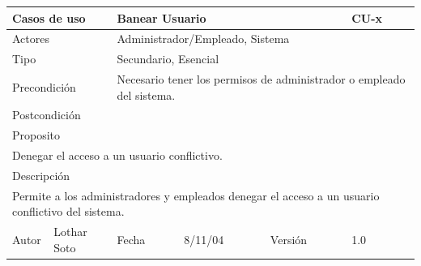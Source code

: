 \documentclass{article}
\begin{document}
\begin{table}[h]
\begin{tabular}{|l|l|l|l|l|l|}
\hline
\multicolumn{2}{|p{2cm}|}{Casos de uso}  & \multicolumn{3}{p{7cm}|}{Banear Usuario} & CU-x \\
\hline
\multicolumn{2}{|p{2cm}|}{Actores}       & \multicolumn{4}{p{8cm}|}{Administrador/Empleado, Sistema}        \\
\hline
\multicolumn{2}{|p{2cm}|}{Tipo}          & \multicolumn{4}{p{8cm}|}{Secundario, Esencial}        \\
\hline
\multicolumn{2}{|p{2cm}|}{Precondición}  & \multicolumn{4}{p{8cm}|}{Necesario tener los permisos de administrador o empleado del sistema.}        \\
\hline
\multicolumn{2}{|p{2cm}|}{Postcondición} & \multicolumn{4}{p{8cm}|}{}        \\
\hline
\multicolumn{6}{|p{10cm}|}{Proposito}                                   \\
\hline
\multicolumn{6}{|p{10cm}|}{Denegar el acceso a un usuario conflictivo.}                                            \\
\hline
\multicolumn{6}{|p{10cm}|}{Descripción}                                 \\
\hline
\multicolumn{6}{|p{10cm}|}{Permite a los administradores y empleados denegar el acceso a un usuario conflictivo del sistema.}                                            \\
\hline
Autor          &       Lothar Soto        & Fecha    &  8/11/04   &   Versión  & 1.0\\    
\hline
\end{tabular}
\end{table}
\end{document}
